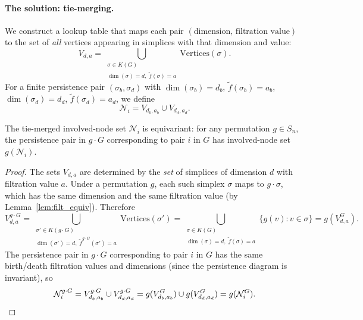 \paragraph{The solution: tie-merging.}
We construct a lookup table that maps each pair $(\text{dimension},\, \text{filtration value})$ to the set of \emph{all} vertices appearing in simplices with that dimension and value:
\[
    V_{d,a} = \bigcup_{\substack{\sigma \in K(G) \\ \dim(\sigma) = d,\; \tilde{f}(\sigma) = a}} \mathrm{Vertices}(\sigma).
\]
For a finite persistence pair $(\sigma_b, \sigma_d)$ with $\dim(\sigma_b) = d_b$, $\tilde{f}(\sigma_b) = a_b$, $\dim(\sigma_d) = d_d$, $\tilde{f}(\sigma_d) = a_d$, we define
\[
    \mathcal{N}_i = V_{d_b, a_b} \cup V_{d_d, a_d}.
\]

\begin{proposition}
\label{prop:tie_merge}
The tie-merged involved-node set $\mathcal{N}_i$ is equivariant: for any permutation $g \in S_n$, the persistence pair in $g \cdot G$ corresponding to pair $i$ in $G$ has involved-node set $g(\mathcal{N}_i)$.
\end{proposition}

\begin{proof}
The sets $V_{d,a}$ are determined by the \emph{set} of simplices of dimension $d$ with filtration value $a$. Under a permutation $g$, each such simplex $\sigma$ maps to $g \cdot \sigma$, which has the same dimension and the same filtration value (by Lemma~\ref{lem:filt_equiv}). Therefore
\[
    V^{g \cdot G}_{d,a}
    = \bigcup_{\substack{\sigma' \in K(g \cdot G) \\ \dim(\sigma') = d,\; \tilde{f}^{g\cdot G}(\sigma') = a}}
      \mathrm{Vertices}(\sigma')
    = \bigcup_{\substack{\sigma \in K(G) \\ \dim(\sigma) = d,\; \tilde{f}(\sigma) = a}}
      \{g(v) : v \in \sigma\}
    = g(V^G_{d,a}).
\]
The persistence pair in $g \cdot G$ corresponding to pair $i$ in $G$ has the same birth/death filtration values and dimensions (since the persistence diagram is invariant), so
\[
    \mathcal{N}_i^{g \cdot G} = V^{g \cdot G}_{d_b, a_b} \cup V^{g \cdot G}_{d_d, a_d}
    = g(V^G_{d_b, a_b}) \cup g(V^G_{d_d, a_d})
    = g(\mathcal{N}_i^G). \qedhere
\]
\end{proof}

